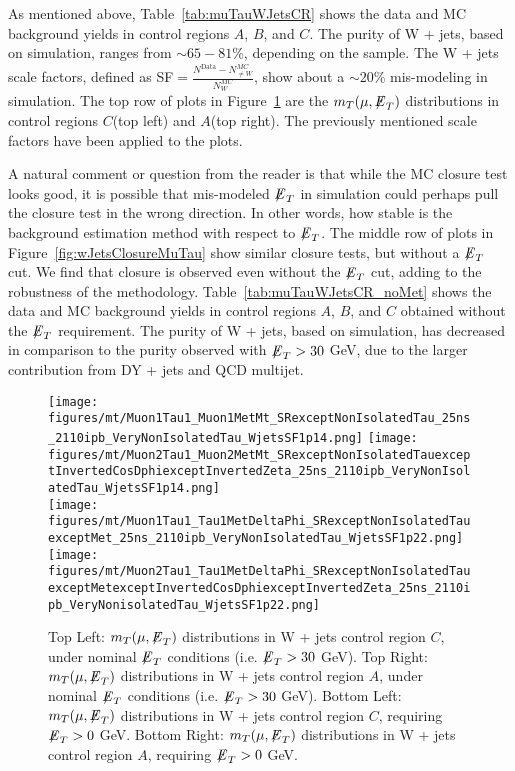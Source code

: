 As mentioned above, Table~\ref{tab:muTauWJetsCR} shows the data and MC background yields in control regions $A$, $B$, and $C$. The purity of W + jets, based on 
simulation, ranges from $\sim 65-81$\%, depending on the sample. The W + jets scale factors, defined as SF$=\frac{N^{\textrm{Data}}-N_{\neq 
W}^{MC}}{N_{W}^{MC}}$, show about a $\sim 20$\% mis-modeling in simulation. The top row of plots in Figure~\ref{fig:wJetsControlPlotsMuTau} are the 
$m_{T}(\mu,{\not\mathrel{E}}_T)$ distributions in control regions $C$(top left) and $A$(top right). The previously mentioned scale factors have been applied to the plots. 

A natural comment or question from the reader is that while the MC closure test looks good, it is possible that mis-modeled ${\not\mathrel{E}}_T$ in simulation could perhaps 
pull the closure test in the wrong direction. In other words, how stable is the background estimation method with respect to ${\not\mathrel{E}}_T$. The middle row of plots in 
Figure~\ref{fig:wJetsClosureMuTau} show similar closure tests, but without a ${\not\mathrel{E}}_T$ cut. We find that closure is observed even without the ${\not\mathrel{E}}_T$ cut, adding 
to the robustness of the methodology. Table~\ref{tab:muTauWJetsCR_noMet} shows the data and MC background yields in control regions $A$, $B$, and $C$ obtained 
without the ${\not\mathrel{E}}_T$ requirement. The purity 
of W + jets, based on simulation, has decreased in comparison to the purity observed with ${\not\mathrel{E}}_T > 30$ GeV, due to the larger contribution from DY + jets and QCD 
multijet. 

\begin{figure}\centering
  \texttt{[image: figures/mt/Muon1Tau1\_Muon1MetMt\_SRexceptNonIsolatedTau\_25ns\_2110ipb\_VeryNonIsolatedTau\_WjetsSF1p14.png]}
  \texttt{[image: figures/mt/Muon2Tau1\_Muon2MetMt\_SRexceptNonIsolatedTauexceptInvertedCosDphiexceptInvertedZeta\_25ns\_2110ipb\_VeryNonIsolatedTau\_WjetsSF1p14.png]} \\
  \texttt{[image: figures/mt/Muon1Tau1\_Tau1MetDeltaPhi\_SRexceptNonIsolatedTauexceptMet\_25ns\_2110ipb\_VeryNonIsolatedTau\_WjetsSF1p22.png]}
  \texttt{[image: figures/mt/Muon2Tau1\_Tau1MetDeltaPhi\_SRexceptNonIsolatedTauexceptMetexceptInvertedCosDphiexceptInvertedZeta\_25ns\_2110ipb\_VeryNonisolatedTau\_WjetsSF1p22.png]}
  \caption{\label{fig:wJetsControlPlotsMuTau} Top Left: $m_{T}(\mu,{\not\mathrel{E}}_T)$ distributions in W + jets control region $C$, under nominal ${\not\mathrel{E}}_T$
conditions (i.e. ${\not\mathrel{E}}_T > 30$ GeV).  Top Right: $m_{T}(\mu,{\not\mathrel{E}}_T)$ distributions in W + jets control region $A$, under nominal ${\not\mathrel{E}}_T$
conditions (i.e. ${\not\mathrel{E}}_T > 30$ GeV).  Bottom Left:  $m_{T}(\mu,{\not\mathrel{E}}_T)$ distributions in W + jets control region $C$, requiring ${\not\mathrel{E}}_T > 0$ GeV.  Bottom Right: 
$m_{T}(\mu,{\not\mathrel{E}}_T)$ distributions in W + jets control region $A$, requiring ${\not\mathrel{E}}_T > 0$ GeV.} 
\end{figure}

